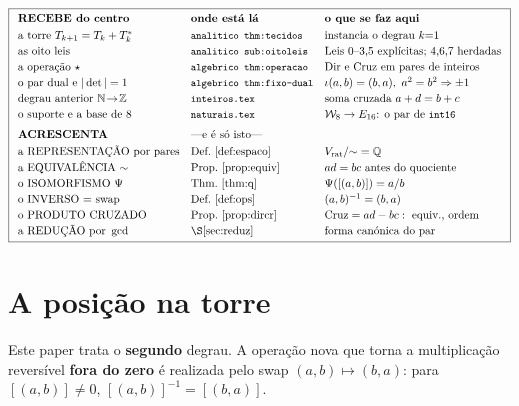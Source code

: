 \documentclass[11pt,a4paper]{article}
\newcommand{\code}[1]{\texttt{\small #1}}
\newcommand{\Word}{\mathcal{W}}
\begin{document}
\[
\boxed{
\begin{array}{lll}
\textbf{RECEBE do centro} & \textbf{onde está lá} & \textbf{o que se faz aqui}\\[3pt]
\text{a torre }T_{k+1}=T_k+T_k^{*} & \code{analitico thm:tecidos} & \text{instancia o degrau }k{=}1\\[2pt]
\text{as oito leis} & \code{analitico sub:oitoleis} & \text{Leis 0--3,5 explícitas; 4,6,7 herdadas}\\[2pt]
\text{a operação }\star & \code{algebrico thm:operacao} & \text{Dir e Cruz em pares de inteiros}\\[2pt]
\text{o par dual e }|\det|=1 & \code{algebrico thm:fixo-dual} & \iota(a,b)=(b,a),\ a^2=b^2\Rightarrow\pm1\\[2pt]
\text{degrau anterior }\mathbb{N}\!\to\!\mathbb{Z} & \code{inteiros.tex} & \text{soma cruzada }a+d=b+c\\[2pt]
\text{o suporte e a base de 8} & \code{naturais.tex} & \Word_8\to E_{16}\text{: o par de \code{int16}}\\[6pt]
\textbf{ACRESCENTA} & \multicolumn{2}{l}{\text{---e é só isto---}}\\[3pt]
\text{a REPRESENTAÇÃO por pares} & \text{Def.~\ref{def:espaco}} & V_{\mathrm{rat}}/{\sim}=\mathbb{Q}\\[2pt]
\text{a EQUIVALÊNCIA }{\sim} & \text{Prop.~\ref{prop:equiv}} & ad=bc\ \text{antes do quociente}\\[2pt]
\text{o ISOMORFISMO }\Psi & \text{Thm.~\ref{thm:q}} & \Psi([(a,b)])=a/b\\[2pt]
\text{o INVERSO = swap} & \text{Def.~\ref{def:ops}} & (a,b)^{-1}=(b,a)\\[2pt]
\text{o PRODUTO CRUZADO} & \text{Prop.~\ref{prop:dircr}} & \text{Cruz}=ad-bc:\text{ equiv., ordem}\\[2pt]
\text{a REDUÇÃO por }\gcd & \S\ref{sec:reduz} & \text{forma canónica do par}
\end{array}}
\]

\section{A posição na torre}\label{sec:torre}

Este paper trata o \textbf{segundo} degrau. A operação nova que torna a
multiplicação reversível \textbf{fora do zero} é realizada pelo swap
$(a,b)\mapsto(b,a)$: para $[(a,b)]\neq 0$, $[(a,b)]^{-1}=[(b,a)]$.

\end{document}

